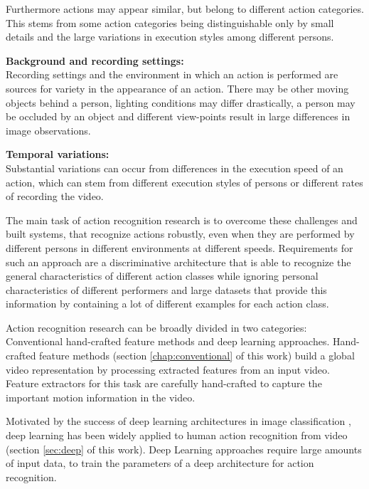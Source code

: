 Furthermore actions may appear similar, but belong to different action categories.
This stems from some action categories being distinguishable only by small details and the large variations in execution styles among different persons.

\textbf{Background and recording settings:} \\
Recording settings and the environment in which an action is performed are sources for variety in the appearance of an action.
There may be other moving objects behind a person, lighting conditions may differ drastically, a person may be occluded by an object and different view-points result in large differences in image observations.

\newpage
\textbf{Temporal variations:} \\
Substantial variations can occur from differences in the execution speed of an action, which can stem from different execution styles of persons or different rates of recording the video.

The main task of action recognition research is to overcome these challenges and built systems, that recognize actions robustly, even when they are performed by different persons in different environments at different speeds.
Requirements for such an approach are a discriminative architecture that is able to recognize the general characteristics of different action classes while ignoring personal characteristics of different performers and large datasets that provide this information by containing a lot of different examples for each action class.

Action recognition research can be broadly divided in two categories: Conventional hand-crafted feature methods and deep learning approaches.
Hand-crafted feature methods (section \ref{chap:conventional} of this work) build a global video representation by processing extracted features from an input video.
Feature extractors for this task are carefully hand-crafted to capture the important motion information in the video.

Motivated by the success of deep learning architectures in image classification \cite{simonyan_very_2014, szegedy_going_2015, he_deep_2015}, deep learning has been widely applied to human action recognition from video (section \ref{sec:deep} of this work).
Deep Learning approaches require large amounts of input data, to train the parameters of a deep architecture for action recognition.

